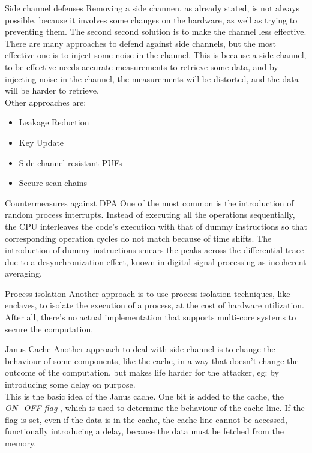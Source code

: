 \begin{section}{Side channel defenses}
  Removing a side channen, as already stated, is not always possible, because it involves some
  changes on the hardware, as well as trying to preventing them. The second second solution is to
  make the channel less effective. There are many approaches to defend against side channels, but
  the most effective one is to inject some noise in the channel. This is because a side channel, to
  be effective needs accurate measurements to retrieve some data, and by injecting noise in the
  channel, the measurements will be distorted, and the data will be harder to retrieve.\\
  Other approaches are:
  \begin{itemize}
    \item Leakage Reduction
    \item Key Update
    \item Side channel-resistant PUFs
    \item Secure scan chains
  \end{itemize}
  \begin{subsection}{Countermeasures against DPA}
    One of the most common is the introduction of random process interrupts. Instead of executing
    all the operations sequentially, the CPU interleaves the code’s execution with that of dummy
    instructions so that corresponding operation cycles do not match because of time shifts. The
    introduction of dummy instructions smears the peaks across the differential trace due to a
    desynchronization effect, known in digital signal processing as incoherent averaging.
  \end{subsection}

  \begin{subsection}{Process isolation}
    Another approach is to use process isolation techniques, like enclaves, to isolate the
    execution of a process, at the cost of hardware utilization. After all, there's no actual
    implementation that supports multi-core systems to secure the computation.
  \end{subsection}

  \begin{subsection}{Janus Cache}
    Another approach to deal with side channel is to change the behaviour of some components, like
    the cache, in a way that doesn't change the outcome of the computation, but makes life harder
    for the attacker, eg: by introducing some delay on purpose.\\
    This is the basic idea of the Janus cache. One bit is added to the cache, the \textit{ON\_OFF flag}
    , which is used to determine the behaviour of the cache line. If the flag is set, even if
    the data is in the cache, the cache line cannot be accessed, functionally introducing a delay,
    because the data must be fetched from the memory.\\


\end{subsection}
\end{section}
